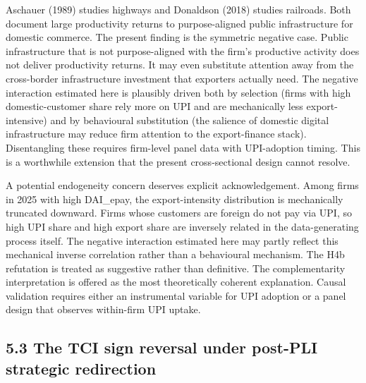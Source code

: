 \documentclass[
  12pt]{article}
\begin{document}
Aschauer (1989) studies highways and Donaldson (2018) studies railroads.
Both document large productivity returns to purpose-aligned public
infrastructure for domestic commerce. The present finding is the
symmetric negative case. Public infrastructure that is not
purpose-aligned with the firm's productive activity does not deliver
productivity returns. It may even substitute attention away from the
cross-border infrastructure investment that exporters actually need. The
negative interaction estimated here is plausibly driven both by
selection (firms with high domestic-customer share rely more on UPI and
are mechanically less export-intensive) and by behavioural substitution
(the salience of domestic digital infrastructure may reduce firm
attention to the export-finance stack). Disentangling these requires
firm-level panel data with UPI-adoption timing. This is a worthwhile
extension that the present cross-sectional design cannot resolve.

A potential endogeneity concern deserves explicit acknowledgement. Among
firms in 2025 with high DAI\_epay, the export-intensity distribution is
mechanically truncated downward. Firms whose customers are foreign do
not pay via UPI, so high UPI share and high export share are inversely
related in the data-generating process itself. The negative interaction
estimated here may partly reflect this mechanical inverse correlation
rather than a behavioural mechanism. The H4b refutation is treated as
suggestive rather than definitive. The complementarity interpretation is
offered as the most theoretically coherent explanation. Causal
validation requires either an instrumental variable for UPI adoption or
a panel design that observes within-firm UPI uptake.

\hypertarget{the-tci-sign-reversal-under-post-pli-strategic-redirection}{%
\subsection{5.3 The TCI sign reversal under post-PLI strategic
redirection}\label{the-tci-sign-reversal-under-post-pli-strategic-redirection}}
\end{document}

